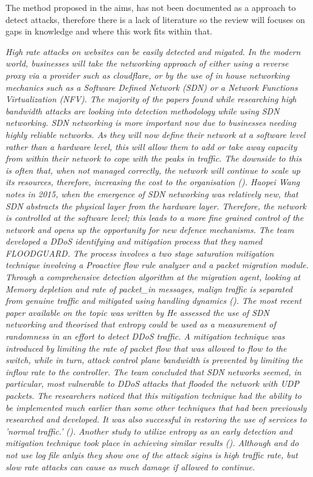 The method proposed in the aims, has not been documented as a approach to detect attacks, therefore there is a lack of literature so the review will focuses on gaps in knowledge and where this work fits within that.

\textit{High rate attacks on websites can be easily detected and migated.  In the modern world, businesses will take the networking approach of either using a reverse proxy via a provider such as cloudflare, or by the use of in house networking mechanics such as a Software Defined Network (SDN) or a Network Functions Virtualization (NFV). The majority of the papers found while researching high bandwidth attacks are looking into detection methodology while using SDN networking. SDN networking is more important now due to businesses needing highly reliable networks.  As they will now define their network at a software level rather than a hardware level, this will allow them to add or take away capacity from within their network to cope with the peaks in traffic. The downside to this is often that, when not managed correctly, the network will continue to scale up its resources, therefore, increasing the cost to the organisation (\cite{Techbeacon}). 
Haopei Wang notes in 2015, when the emergence of SDN networking was relatively new, that SDN abstracts the physical layer from the hardware layer. Therefore, the network is controlled at the software level; this leads to a more fine grained control of the network and opens up the opportunity for new defence mechanisms. The team developed a DDoS identifying and mitigation process that they named FLOODGUARD. The process involves a two stage saturation mitigation technique involving a Proactive flow rule analyzer and a packet migration module. Through a comprehensive detection algorithm at the migration agent, looking at Memory depletion and rate of packet\_in messages, malign traffic is separated from genuine traffic and mitigated using handling dynamics (\cite{7266854}).
The most recent paper available on the topic was written by \citeauthor{ahalawat2019entropy} He assessed the use of SDN networking and theorised that entropy could be used as a measurement of randomness in an effort to detect DDoS traffic. A mitigation technique was introduced by limiting the rate of packet flow that was allowed to flow to the switch, while in turn, attack control plane bandwidth is prevented by limiting the inflow rate to the controller.  The team concluded that SDN networks seemed, in particular, most vulnerable to DDoS attacks that flooded the network with UDP packets. The researchers noticed that this mitigation technique had the ability to be implemented much earlier than some other techniques that had been previously researched and developed. It was also successful in restoring the use of services to 'normal traffic.' (\cite{ahalawat2019entropy}). Another study to utilize entropy as an early detection and mitigation technique took place in \citeyear{kumar2018safety} achieving similar results (\cite{kumar2018safety}). Although \citeauthor{ahalawat2019entropy} and \citeauthor{kumar2018safety} do not use log file anlyis they show one of the  attack sigins is high traffic rate, but slow rate attacks can cause as much damage if allowed to continue.
}
